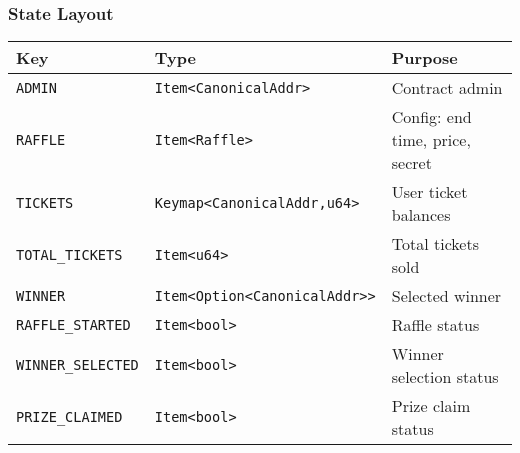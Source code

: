 \documentclass{article}
\begin{document}
\subsubsection{State Layout}
\begin{center}
\begin{tabular}{@{}lll@{}}
\toprule
Key & Type & Purpose \\
\midrule
\texttt{ADMIN} & \texttt{Item<CanonicalAddr>} & Contract admin \\
\texttt{RAFFLE} & \texttt{Item<Raffle>} & Config: end time, price, secret \\
\texttt{TICKETS} & \texttt{Keymap<CanonicalAddr,u64>} & User ticket balances \\
\texttt{TOTAL\_TICKETS} & \texttt{Item<u64>} & Total tickets sold \\
\texttt{WINNER} & \texttt{Item<Option<CanonicalAddr>>} & Selected winner \\
\texttt{RAFFLE\_STARTED} & \texttt{Item<bool>} & Raffle status \\
\texttt{WINNER\_SELECTED} & \texttt{Item<bool>} & Winner selection status \\
\texttt{PRIZE\_CLAIMED} & \texttt{Item<bool>} & Prize claim status \\
\bottomrule
\end{tabular}
\end{center}
\end{document}
